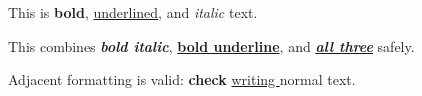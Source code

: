 \documentclass[11pt]{article}
\begin{document}
This is \textbf{bold}, \underline{underlined}, and \textit{italic} text.

This combines \textbf{\textit{bold italic}}, \textbf{\underline{bold underline}}, and \textbf{\textit{\underline{all three}}} safely.

Adjacent formatting is valid: \textbf{check }\underline{writing }normal text.
\end{document}
